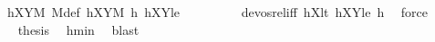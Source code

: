 \begin{isabellebody}
\ hXYM\ M{\isacharunderscore}{\kern0pt}def\ hXY{}M\ h\ hXY{}le\ \isanewline
\ \ \ \ \ \ \ \ devos{\isacharunderscore}{\kern0pt}rel{\isacharunderscore}{\kern0pt}iff\ hX{}lt\ hXY{}le\ h\ \isamarkupfalse%
\ force\isanewline
\ \ \ \ \isamarkupfalse%
\ \isamarkupfalse%
\ {\isacharquery}{\kern0pt}thesis\ \isamarkupfalse%
\ hmin\ \isamarkupfalse%
\ blast\isanewline
\ \ \isamarkupfalse%
\isanewline
{}\isamarkupfalse%
%
\endisatagproof
{\isafoldproof}%
%
\isadelimproof
\isanewline
%
\endisadelimproof
\isanewline
%
\isadelimtheory
\isanewline
%
\endisadelimtheory
%
\isatagtheory
{}\isamarkupfalse%
%
\endisatagtheory
{\isafoldtheory}%
%
\isadelimtheory
%
\endisadelimtheory
%
\end{isabellebody}%
\endinput
